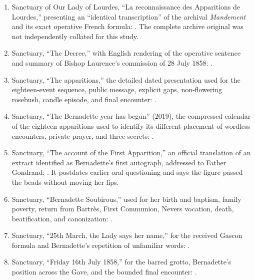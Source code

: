 \begin{enumerate}
  \item Sanctuary of Our Lady of Lourdes, “La reconnaissance des Apparitions de Lourdes,” presenting an “identical transcription” of the archival \emph{Mandement} and its exact operative French formula: . The complete archive original was not independently collated for this study.
  \item Sanctuary, “The Decree,” with English rendering of the operative sentence and summary of Bishop Laurence's commission of 28 July 1858: .
  \item Sanctuary, “The apparitions,” the detailed dated presentation used for the eighteen-event sequence, public message, explicit gaps, non-flowering rosebush, candle episode, and final encounter: .
  \item Sanctuary, “The Bernadette year has begun” (2019), the compressed calendar of the eighteen apparitions used to identify its different placement of wordless encounters, private prayer, and three secrets: .
  \item Sanctuary, “The account of the First Apparition,” an official translation of an extract identified as Bernadette's first autograph, addressed to Father Gondrand: . It postdates earlier oral questioning and says the figure passed the beads without moving her lips.
  \item Sanctuary, “Bernadette Soubirous,” used for her birth and baptism, family poverty, return from Bartrès, First Communion, Nevers vocation, death, beatification, and canonization: .
  \item Sanctuary, “25th March, the Lady says her name,” for the received Gascon formula and Bernadette's repetition of unfamiliar words: .
  \item Sanctuary, “Friday 16th July 1858,” for the barred grotto, Bernadette's position across the Gave, and the bounded final encounter: .
\end{enumerate}

